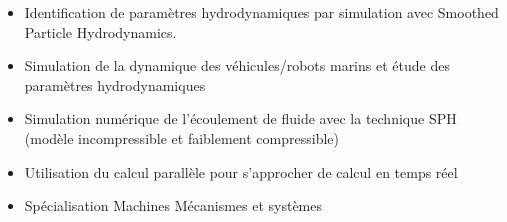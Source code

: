 \documentclass[10pt,a4paper,ragged2e,withhyper]{altacv}
\begin{document}
\begin{paracol}{2}
            \divider
            
            
        
            \begin{itemize}
                \item Identification de paramètres hydrodynamiques par simulation avec Smoothed Particle Hydrodynamics.
                \item Simulation de la dynamique des véhicules/robots marins et étude des paramètres hydrodynamiques
                \item Simulation numérique de l'écoulement de fluide avec la technique SPH (modèle incompressible et faiblement compressible)
                \item Utilisation du calcul parallèle pour s'approcher de calcul en temps réel
            \end{itemize}
            \divider
            
            \begin{itemize}
                \item Spécialisation Machines Mécanismes et systèmes
            \end{itemize}
            
            \nocite{*}
            \printbibliography[heading=none]
            
    \end{paracol}
\end{document}
